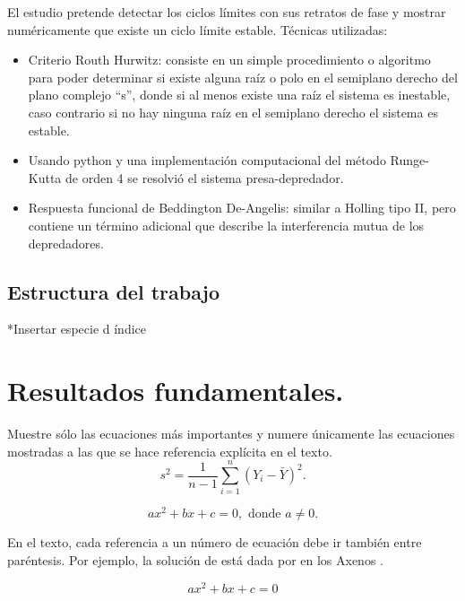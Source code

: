 \documentclass{wscpaperproc}
\theoremstyle{wsc}
\begin{document}
El estudio pretende detectar los ciclos límites con sus retratos de fase y mostrar numéricamente que existe un ciclo límite estable.
Técnicas utilizadas:
\begin{itemize}
	\item Criterio Routh Hurwitz: consiste en un simple procedimiento o algoritmo para poder determinar si existe alguna raíz o polo en el semiplano derecho del
	      plano complejo “s”, donde si al menos existe una raíz el sistema es inestable, caso contrario si no hay ninguna raíz en el semiplano derecho el sistema es estable.
	\item Usando python y una implementación computacional del método Runge-Kutta de orden 4 se resolvió el sistema presa-depredador.
	\item Respuesta funcional de Beddington De-Angelis: similar a Holling tipo II, pero contiene un término adicional que describe la interferencia mutua de los depredadores.
\end{itemize}
\subsection{Estructura del trabajo}
*Insertar especie d índice

\section{Resultados fundamentales.}

Muestre sólo las ecuaciones más importantes y numere únicamente las ecuaciones mostradas a las que se hace referencia explícita en el texto. \\

$$s^2 = \frac 1 {n-1} \sum_{i=1}^n (Y_i - \bar Y)^2.$$

\begin{equation}%
	ax^2 + bx + c = 0, \mbox{ donde } a \ne 0.
\end{equation}

En el texto, cada referencia a un número de ecuación debe ir también entre paréntesis. Por ejemplo, la solución de está dada por  en los Axenos .


\begin{equation}%
	ax^2 + bx + c = 0
\end{equation}
\end{document}
